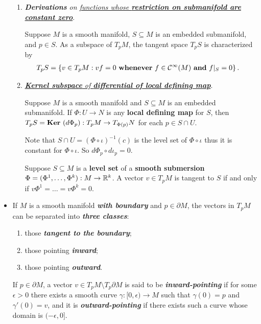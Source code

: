 \documentclass[11pt]{article}
\begin{document}
\begin{itemize}
\begin{enumerate}
\item \emph{\textbf{Derivations} on \underline{functions whose \textbf{restriction on submanifold are constant zero}}}.
\begin{proposition}
Suppose $M$ is a smooth manifold, $S\subseteq M$ is an embedded submanifold, and $p \in S$. As a subspace of $T_{p}M$, the tangent space $T_{p}S$ is characterized
by
\begin{align*}
T_{p}S &= \left\{v \in T_{p}M: vf = 0\text{ \textbf{whenever} }f \in {\mathcal C}^{\infty}(M)\text{ \textbf{and} }f|_{S} = 0\right\}.
\end{align*}
\end{proposition}

\item \underline{\emph{\textbf{Kernel subspace} of \textbf{differential of local defining map}}}.
\begin{proposition}
Suppose $M$ is a smooth manifold and $S \subseteq M$ is an embedded submanifold. If $\Phi: U \rightarrow N$ is any \textbf{local defining map} for $S$, then $T_{p}S = 
\text{\textbf{Ker} }(d\Phi_{p}): T_{p}M \rightarrow T_{\Phi(p)}N$ for each $p \in S \cap U$.
\end{proposition} Note that $S\cap U = (\Phi \circ \iota)^{-1}(c)$ is the level set of $\Phi \circ \iota$ thus it is constant for $\Phi \circ \iota$. So $d\Phi_p \circ d\iota_p = 0$.

\begin{corollary}
Suppose $S \subseteq M$ is a \textbf{level set} of a \textbf{smooth submersion} $\Phi = (\Phi^1,\ldots,\Phi^k): M \rightarrow {\mathbb R}^k$. A vector $v \in T_{p}M$ is tangent to $S$ if and only if $v\Phi^1 = \ldots = v\Phi^k = 0$.
\end{corollary}
\end{enumerate}

\item \begin{remark}
If $M$ is a smooth manifold \emph{\textbf{with boundary}} and $p \in \partial M$, the vectors in $T_{p}M$ can be separated into \emph{\textbf{three classes}}:  
\begin{enumerate}
\item those \emph{\textbf{tangent to the boundary}};
\item those pointing \emph{\textbf{inward}}; 
\item those pointing \emph{\textbf{outward}}.
\end{enumerate}

 \begin{definition}
If $p \in \partial M$, a vector $v \in T_{p}M \setminus T_{p}\partial M$ is said to be \emph{\textbf{inward-pointing}} if for some $\epsilon > 0$ there exists a smooth curve $\gamma: [0, \epsilon)\rightarrow M$ such that $\gamma(0) = p$ and $\gamma'(0) = v$, and it is \emph{\textbf{outward-pointing}} if there exists such a curve whose domain is $(-\epsilon, 0]$.
\end{definition}


\end{remark}
\end{itemize}
\end{document}
